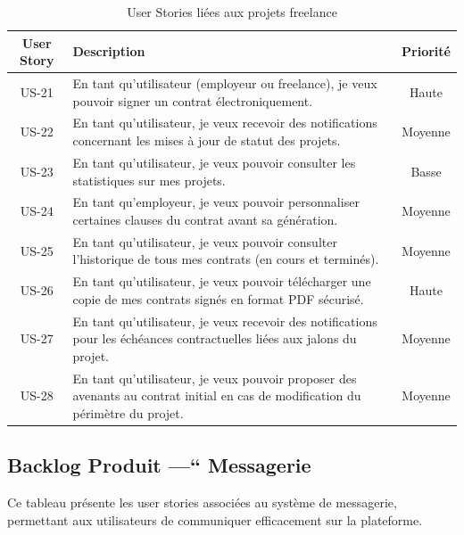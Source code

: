 \begin{table}[H]
\centering
\begin{tabularx}{\textwidth}{|c|X|c|}
\hline
\textbf{User Story} & \textbf{Description} & \textbf{Priorité} \\
\hline
US-21 & En tant qu'utilisateur (employeur ou freelance), je veux pouvoir signer un contrat électroniquement. & Haute \\
\hline
US-22 & En tant qu'utilisateur, je veux recevoir des notifications concernant les mises à jour de statut des projets. & Moyenne \\
\hline
US-23 & En tant qu'utilisateur, je veux pouvoir consulter les statistiques sur mes projets. & Basse \\
\hline
US-24 & En tant qu'employeur, je veux pouvoir personnaliser certaines clauses du contrat avant sa génération. & Moyenne \\
\hline
US-25 & En tant qu'utilisateur, je veux pouvoir consulter l'historique de tous mes contrats (en cours et terminés). & Moyenne \\
\hline
US-26 & En tant qu'utilisateur, je veux pouvoir télécharger une copie de mes contrats signés en format PDF sécurisé. & Haute \\
\hline
US-27 & En tant qu'utilisateur, je veux recevoir des notifications pour les échéances contractuelles liées aux jalons du projet. & Moyenne \\
\hline
US-28 & En tant qu'utilisateur, je veux pouvoir proposer des avenants au contrat initial en cas de modification du périmètre du projet. & Moyenne \\
\hline
\end{tabularx}
\caption{User Stories liées aux projets freelance}
\end{table}


\subsection{Backlog Produit —“ Messagerie}
Ce tableau présente les user stories associées au système de messagerie, permettant aux utilisateurs de communiquer efficacement sur la plateforme.

